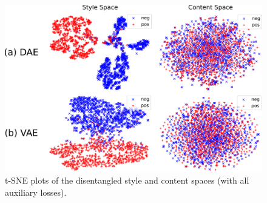 \documentclass[letterpaper]{article} %
\begin{document}
\begin{figure}[!t]
	\centering
	\includegraphics[width=\linewidth]{latent-spaces}
	\caption{t-SNE plots of the disentangled style and content spaces (with all auxiliary losses).}
	\label{fig:tsne-plots}
\end{figure}
\end{document}
